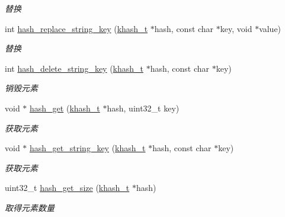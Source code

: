 \begin{DoxyCompactItemize}
\begin{DoxyCompactList}\small\item\em 替换 \end{DoxyCompactList}\item 
int \hyperlink{a00064_a042aba69d8451fd5322e3fe28aa65306_a042aba69d8451fd5322e3fe28aa65306}{hash\+\_\+replace\+\_\+string\+\_\+key} (\hyperlink{a00053_aa242a9a673d8677076543d5768798f2c_aa242a9a673d8677076543d5768798f2c}{khash\+\_\+t} $\ast$hash, const char $\ast$key, void $\ast$value)
\begin{DoxyCompactList}\small\item\em 替换 \end{DoxyCompactList}\item 
int \hyperlink{a00064_a74d116a714c4a2078f3163d7943ad41e_a74d116a714c4a2078f3163d7943ad41e}{hash\+\_\+delete\+\_\+string\+\_\+key} (\hyperlink{a00053_aa242a9a673d8677076543d5768798f2c_aa242a9a673d8677076543d5768798f2c}{khash\+\_\+t} $\ast$hash, const char $\ast$key)
\begin{DoxyCompactList}\small\item\em 销毁元素 \end{DoxyCompactList}\item 
void $\ast$ \hyperlink{a00064_a0cb115747d9533d24341fd2620c3ffb9_a0cb115747d9533d24341fd2620c3ffb9}{hash\+\_\+get} (\hyperlink{a00053_aa242a9a673d8677076543d5768798f2c_aa242a9a673d8677076543d5768798f2c}{khash\+\_\+t} $\ast$hash, uint32\+\_\+t key)
\begin{DoxyCompactList}\small\item\em 获取元素 \end{DoxyCompactList}\item 
void $\ast$ \hyperlink{a00064_afdbec876fbce40dd8750d26bb7f59e5b_afdbec876fbce40dd8750d26bb7f59e5b}{hash\+\_\+get\+\_\+string\+\_\+key} (\hyperlink{a00053_aa242a9a673d8677076543d5768798f2c_aa242a9a673d8677076543d5768798f2c}{khash\+\_\+t} $\ast$hash, const char $\ast$key)
\begin{DoxyCompactList}\small\item\em 获取元素 \end{DoxyCompactList}\item 
uint32\+\_\+t \hyperlink{a00064_a5cd157b8d91524da9b9f4a07f9d07f39_a5cd157b8d91524da9b9f4a07f9d07f39}{hash\+\_\+get\+\_\+size} (\hyperlink{a00053_aa242a9a673d8677076543d5768798f2c_aa242a9a673d8677076543d5768798f2c}{khash\+\_\+t} $\ast$hash)
\begin{DoxyCompactList}\small\item\em 取得元素数量 \end{DoxyCompactList}\item 

\end{DoxyCompactItemize}
